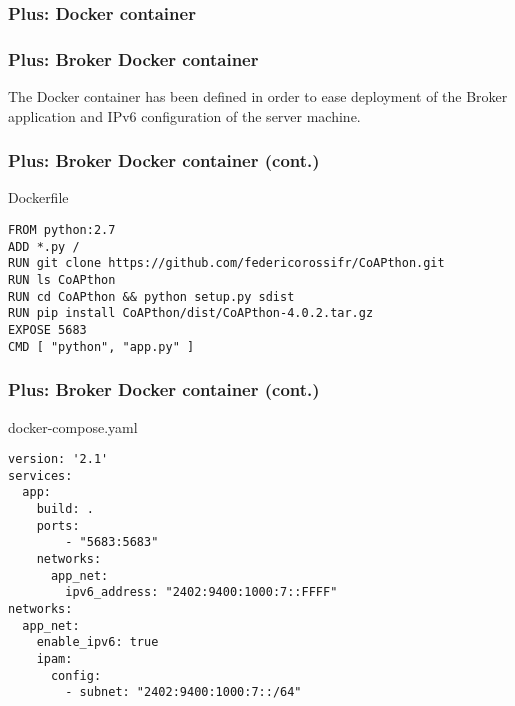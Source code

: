 \documentclass{beamer}
\begin{document}
\subsubsection{Plus: Docker container}
\begin{frame}
\frametitle{Plus: Broker Docker container}
The Docker container has been defined in order to ease deployment of the Broker application and IPv6 configuration of the server machine.
\end{frame}

\begin{frame}[fragile]
\frametitle{Plus: Broker Docker container (cont.)}
\begin{exampleblock}{Dockerfile}
	\begin{Verbatim}[fontsize=\footnotesize]
FROM python:2.7
ADD *.py /
RUN git clone https://github.com/federicorossifr/CoAPthon.git
RUN ls CoAPthon
RUN cd CoAPthon && python setup.py sdist
RUN pip install CoAPthon/dist/CoAPthon-4.0.2.tar.gz
EXPOSE 5683
CMD [ "python", "app.py" ]
	\end{Verbatim}
\end{exampleblock}
\end{frame}

\begin{frame}[fragile]
\frametitle{Plus: Broker Docker container (cont.)}
\begin{exampleblock}{docker-compose.yaml}
	\begin{Verbatim}[fontsize=\footnotesize]
version: '2.1'
services:
  app:
    build: .
    ports:
        - "5683:5683"
    networks:
      app_net:
        ipv6_address: "2402:9400:1000:7::FFFF"
networks:
  app_net:
    enable_ipv6: true
    ipam:
      config:
        - subnet: "2402:9400:1000:7::/64"
	\end{Verbatim}
\end{exampleblock}
\end{frame}
\end{document}
